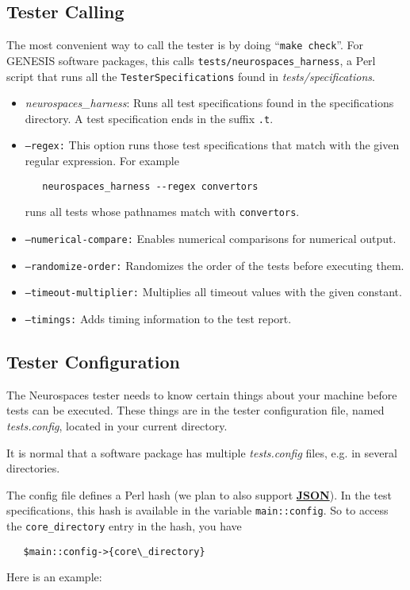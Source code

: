 \documentclass[12pt]{article}
\begin{document}
\subsection*{Tester Calling}

The most convenient way to call the tester is by doing ``{\tt make check}''. For GENESIS software packages, this calls {\tt tests/neurospaces\_harness}, a Perl script that runs all the {\tt TesterSpecifications} found in {\it tests/specifications}.

\begin{itemize}
\item {\it neurospaces\_harness}: Runs all test specifications found in the specifications directory. A test specification ends in the suffix {\tt .t}.
\item {\tt --regex:} This option runs those test specifications that match with the given regular expression. For example
\begin{verbatim}
   neurospaces_harness --regex convertors
\end{verbatim}
runs all tests whose pathnames match with {\tt convertors}.
\item {\tt --numerical-compare:} Enables numerical comparisons for numerical output.
\item {\tt --randomize-order:} Randomizes the order of the tests before executing them.
\item {\tt --timeout-multiplier:} Multiplies all timeout values with the given constant.
\item {\tt --timings:} Adds timing information to the test report.
\end{itemize}
    
\subsection*{Tester Configuration}

The Neurospaces tester needs to know certain things about your machine before tests can be executed. These things are in the tester configuration file, named {\it tests.config}, located in your current directory.

It is normal that a software package has multiple {\it tests.config} files, e.g. in several directories.

The config file defines a Perl hash (we plan to also support \href{http://www.json.org/}{\bf JSON}). In the test specifications, this hash is available in the variable {\tt main::config}. So to access the {\tt core\_directory} entry in the hash, you have
\begin{verbatim}
   $main::config->{core\_directory}
\end{verbatim}
Here is an example:
\end{document}

